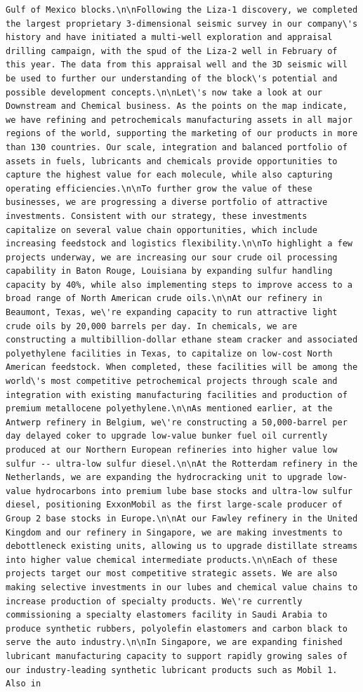 \documentclass[
  letterpaper,
  DIV=11,
  numbers=noendperiod]{scrreprt}
\begin{document}
\begin{verbatim}
Gulf of Mexico blocks.\n\nFollowing the Liza-1 discovery, we completed the largest proprietary 3-dimensional seismic survey in our company\'s history and have initiated a multi-well exploration and appraisal drilling campaign, with the spud of the Liza-2 well in February of this year. The data from this appraisal well and the 3D seismic will be used to further our understanding of the block\'s potential and possible development concepts.\n\nLet\'s now take a look at our Downstream and Chemical business. As the points on the map indicate, we have refining and petrochemicals manufacturing assets in all major regions of the world, supporting the marketing of our products in more than 130 countries. Our scale, integration and balanced portfolio of assets in fuels, lubricants and chemicals provide opportunities to capture the highest value for each molecule, while also capturing operating efficiencies.\n\nTo further grow the value of these businesses, we are progressing a diverse portfolio of attractive investments. Consistent with our strategy, these investments capitalize on several value chain opportunities, which include increasing feedstock and logistics flexibility.\n\nTo highlight a few projects underway, we are increasing our sour crude oil processing capability in Baton Rouge, Louisiana by expanding sulfur handling capacity by 40%, while also implementing steps to improve access to a broad range of North American crude oils.\n\nAt our refinery in Beaumont, Texas, we\'re expanding capacity to run attractive light crude oils by 20,000 barrels per day. In chemicals, we are constructing a multibillion-dollar ethane steam cracker and associated polyethylene facilities in Texas, to capitalize on low-cost North American feedstock. When completed, these facilities will be among the world\'s most competitive petrochemical projects through scale and integration with existing manufacturing facilities and production of premium metallocene polyethylene.\n\nAs mentioned earlier, at the Antwerp refinery in Belgium, we\'re constructing a 50,000-barrel per day delayed coker to upgrade low-value bunker fuel oil currently produced at our Northern European refineries into higher value low sulfur -- ultra-low sulfur diesel.\n\nAt the Rotterdam refinery in the Netherlands, we are expanding the hydrocracking unit to upgrade low-value hydrocarbons into premium lube base stocks and ultra-low sulfur diesel, positioning ExxonMobil as the first large-scale producer of Group 2 base stocks in Europe.\n\nAt our Fawley refinery in the United Kingdom and our refinery in Singapore, we are making investments to debottleneck existing units, allowing us to upgrade distillate streams into higher value chemical intermediate products.\n\nEach of these projects target our most competitive strategic assets. We are also making selective investments in our lubes and chemical value chains to increase production of specialty products. We\'re currently commissioning a specialty elastomers facility in Saudi Arabia to produce synthetic rubbers, polyolefin elastomers and carbon black to serve the auto industry.\n\nIn Singapore, we are expanding finished lubricant manufacturing capacity to support rapidly growing sales of our industry-leading synthetic lubricant products such as Mobil 1. Also in 
\end{verbatim}
\end{document}
